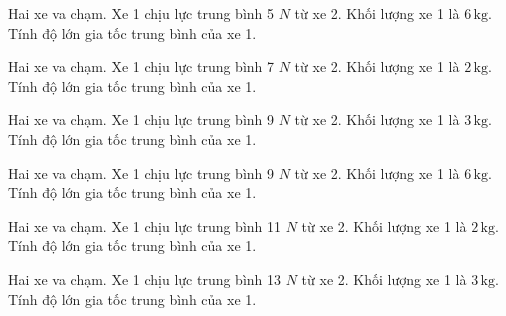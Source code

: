 \begin{ex}
Hai xe va chạm. Xe 1 chịu lực trung bình 5 $N$ từ xe 2. Khối lượng xe 1 là $6\,\text{kg}$. Tính độ lớn gia tốc trung bình của xe 1.
\end{ex}

\begin{ex}
Hai xe va chạm. Xe 1 chịu lực trung bình 7 $N$ từ xe 2. Khối lượng xe 1 là $2\,\text{kg}$. Tính độ lớn gia tốc trung bình của xe 1.
\end{ex}

\begin{ex}
Hai xe va chạm. Xe 1 chịu lực trung bình 9 $N$ từ xe 2. Khối lượng xe 1 là $3\,\text{kg}$. Tính độ lớn gia tốc trung bình của xe 1.
\end{ex}

\begin{bt}
Hai xe va chạm. Xe 1 chịu lực trung bình 9 $N$ từ xe 2. Khối lượng xe 1 là $6\,\text{kg}$. Tính độ lớn gia tốc trung bình của xe 1.
\end{bt}

\begin{bt}
Hai xe va chạm. Xe 1 chịu lực trung bình 11 $N$ từ xe 2. Khối lượng xe 1 là $2\,\text{kg}$. Tính độ lớn gia tốc trung bình của xe 1.
\end{bt}

\begin{bt}
Hai xe va chạm. Xe 1 chịu lực trung bình 13 $N$ từ xe 2. Khối lượng xe 1 là $3\,\text{kg}$. Tính độ lớn gia tốc trung bình của xe 1.
\end{bt}

